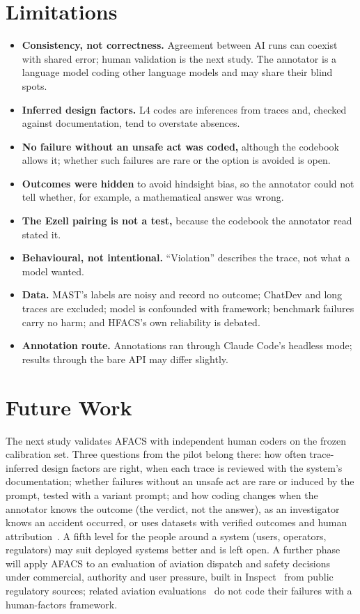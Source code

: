 \documentclass[10pt,a4paper]{article}
\begin{document}
\section{Limitations}

\begin{itemize}\setlength{\itemsep}{1pt}
  \item \textbf{Consistency, not correctness.} Agreement between AI runs can
  coexist with shared error; human validation is the next study. The annotator is
  a language model coding other language models and may share their blind spots.
  \item \textbf{Inferred design factors.} L4 codes are inferences from traces and,
  checked against documentation, tend to overstate absences.
  \item \textbf{No failure without an unsafe act was coded,} although the codebook
  allows it; whether such failures are rare or the option is avoided is open.
  \item \textbf{Outcomes were hidden} to avoid hindsight bias, so the annotator
  could not tell whether, for example, a mathematical answer was wrong.
  \item \textbf{The Ezell pairing is not a test,} because the codebook the
  annotator read stated it.
  \item \textbf{Behavioural, not intentional.} ``Violation'' describes the trace,
  not what a model wanted.
  \item \textbf{Data.} MAST's labels are noisy and record no outcome; ChatDev and
  long traces are excluded; model is confounded with framework; benchmark failures
  carry no harm; and HFACS's own reliability is debated.
  \item \textbf{Annotation route.} Annotations ran through Claude Code's headless
  mode; results through the bare API may differ slightly.
\end{itemize}

\section{Future Work}

The next study validates AFACS with independent human coders on the frozen
calibration set. Three questions from the pilot belong there: how often
trace-inferred design factors are right, when each trace is reviewed with the
system's documentation; whether failures without an unsafe act are rare or induced
by the prompt, tested with a variant prompt; and how coding changes when the
annotator knows the outcome (the verdict, not the answer), as an investigator knows
an accident occurred, or uses datasets with verified outcomes and human
attribution~\cite{zhang2025whowhen}. A fifth level for the people around a system
(users, operators, regulators) may suit deployed systems better and is left open.
A further phase will apply AFACS to an evaluation of aviation dispatch and safety
decisions under commercial, authority and user pressure, built in
Inspect~\cite{aisi2024inspect} from public regulatory sources; related aviation
evaluations~\cite{brooker2026preflight,wu2026pilotbench,yuan2026aerocopilotbench}
do not code their failures with a human-factors framework.
\end{document}
